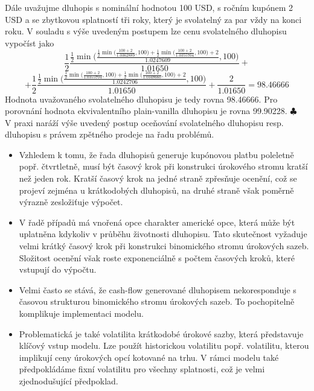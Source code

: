 \documentclass[a4paper]{book}
\begin{document}
Dále uvažujme dluhopis s nominální hodnotou 100 USD, s ročním kupónem 2 USD a se zbytkovou splatností tři roky, který je svolatelný za par vždy na konci roku. V souladu s výše uvedeným postupem lze cenu svolatelného dluhopisu vypočíst jako
\begin{equation*}
\frac{1}{2}\frac{\frac{1}{2}\min \Bigg(\frac{\frac{1}{2}\min \Big( \frac{100 + 2}{1.0362889},100 \Big) + \frac{1}{2}\min \Big( \frac{100 + 2}{1.0355704},100 \Big) + 2}{1.0247609},100 \Bigg)}{1.01650} +
\end{equation*}
\begin{equation*}
+  \frac{1}{2}\frac{\frac{1}{2}\min \Bigg(\frac{\frac{1}{2}\min \Big( \frac{100 + 2}{1.0355704},100 \Big) + \frac{1}{2}\min \Big( \frac{100 + 2}{1.0348660},100 \Big) + 2}{1.0242706},100 \Bigg)}{1.01650} + \frac{2}{1.01650} = 98.46666
\end{equation*}
Hodnota uvažovaného svolatelného dluhopisu je tedy rovna 98.46666. Pro porovnání hodnota ekvivalentního plain-vanilla dluhopisu je rovna 99.90228.
$\clubsuit$\\

V praxi naráží výše uvedený postup oceňování svolatelného dluhopisu resp. dluhopisu s právem zpětného prodeje na řadu problémů.
\begin{itemize}
\item Vzhledem k tomu, že řada dluhopisů generuje kupónovou platbu poleletně popř. čtvrtletně, musí být časový krok při konstrukci úrokového stromu kratší než jeden rok. Kratší časový krok na jedné straně zpřesňuje ocenění, což se projeví zejména u krátkodobých dluhopisů, na druhé straně však poměrně výrazně zesložiťuje výpočet.
\item V řadě případů má vnořená opce charakter americké opce, která může být uplatněna kdykoliv v průběhu životnosti dluhopisu. Tato skutečnost vyžaduje velmi krátký časový krok při konstrukci binomického stromu úrokových sazeb. Složitost ocenění však roste exponenciálně s počtem časových kroků, které vstupují do výpočtu.
\item Velmi často se stává, že cash-flow generované dluhopisem nekoresponduje s časovou strukturou binomického stromu úrokových sazeb. To pochopitelně komplikuje implementaci modelu.
\item Problematická je také volatilita krátkodobé úrokové sazby, která představuje klíčový vstup modelu. Lze použít historickou volatilitu popř. volatilitu, kterou implikují ceny úrokových opcí kotované na trhu. V rámci modelu také předpokládáme fixní volatilitu pro všechny splatnosti, což je velmi zjednodušující předpoklad.
\end{itemize}
\end{document}
